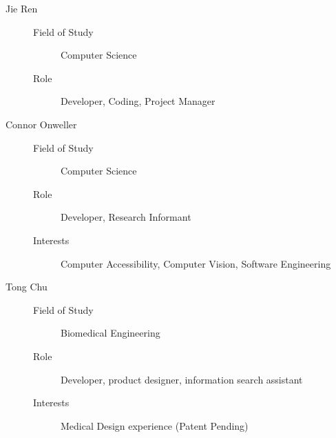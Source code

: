 \documentclass[manuscript, nonacm]{acmart}
\begin{document}
\begin{description}
\item[Jie Ren] \hfill
  \begin{description}
    \item[Field of Study] Computer Science
    \item[Role] Developer, Coding, Project Manager
  \end{description}
\item[Connor Onweller] \hfill
  \begin{description}
    \item[Field of Study] Computer Science
    \item[Role] Developer, Research Informant
    \item[Interests] Computer Accessibility, Computer Vision, Software Engineering
  \end{description}
\item[Tong Chu] \hfill
  \begin{description}
    \item[Field of Study] Biomedical Engineering
    \item[Role] Developer, product designer, information search assistant 
    \item[Interests] Medical Design experience (Patent Pending)
  \end{description}
\end{description}




\end{document}

